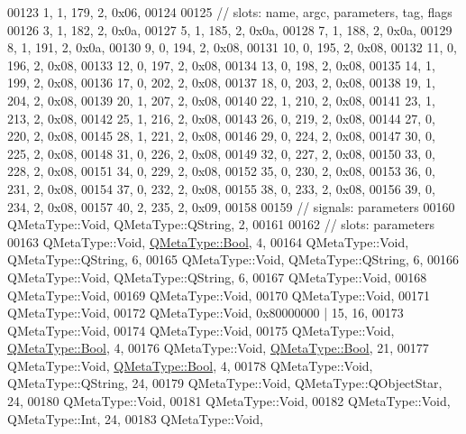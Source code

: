 \begin{DoxyCode}
00123        1,    1,  179,    2, 0x06,
00124 
00125  \textcolor{comment}{// slots: name, argc, parameters, tag, flags}
00126        3,    1,  182,    2, 0x0a,
00127        5,    1,  185,    2, 0x0a,
00128        7,    1,  188,    2, 0x0a,
00129        8,    1,  191,    2, 0x0a,
00130        9,    0,  194,    2, 0x08,
00131       10,    0,  195,    2, 0x08,
00132       11,    0,  196,    2, 0x08,
00133       12,    0,  197,    2, 0x08,
00134       13,    0,  198,    2, 0x08,
00135       14,    1,  199,    2, 0x08,
00136       17,    0,  202,    2, 0x08,
00137       18,    0,  203,    2, 0x08,
00138       19,    1,  204,    2, 0x08,
00139       20,    1,  207,    2, 0x08,
00140       22,    1,  210,    2, 0x08,
00141       23,    1,  213,    2, 0x08,
00142       25,    1,  216,    2, 0x08,
00143       26,    0,  219,    2, 0x08,
00144       27,    0,  220,    2, 0x08,
00145       28,    1,  221,    2, 0x08,
00146       29,    0,  224,    2, 0x08,
00147       30,    0,  225,    2, 0x08,
00148       31,    0,  226,    2, 0x08,
00149       32,    0,  227,    2, 0x08,
00150       33,    0,  228,    2, 0x08,
00151       34,    0,  229,    2, 0x08,
00152       35,    0,  230,    2, 0x08,
00153       36,    0,  231,    2, 0x08,
00154       37,    0,  232,    2, 0x08,
00155       38,    0,  233,    2, 0x08,
00156       39,    0,  234,    2, 0x08,
00157       40,    2,  235,    2, 0x09,
00158 
00159  \textcolor{comment}{// signals: parameters}
00160     QMetaType::Void, QMetaType::QString,    2,
00161 
00162  \textcolor{comment}{// slots: parameters}
00163     QMetaType::Void, \hyperlink{a00001_a76a8b016e5ad61faf9062cc387df5016}{QMetaType::Bool},    4,
00164     QMetaType::Void, QMetaType::QString,    6,
00165     QMetaType::Void, QMetaType::QString,    6,
00166     QMetaType::Void, QMetaType::QString,    6,
00167     QMetaType::Void,
00168     QMetaType::Void,
00169     QMetaType::Void,
00170     QMetaType::Void,
00171     QMetaType::Void,
00172     QMetaType::Void, 0x80000000 | 15,   16,
00173     QMetaType::Void,
00174     QMetaType::Void,
00175     QMetaType::Void, \hyperlink{a00001_a76a8b016e5ad61faf9062cc387df5016}{QMetaType::Bool},    4,
00176     QMetaType::Void, \hyperlink{a00001_a76a8b016e5ad61faf9062cc387df5016}{QMetaType::Bool},   21,
00177     QMetaType::Void, \hyperlink{a00001_a76a8b016e5ad61faf9062cc387df5016}{QMetaType::Bool},    4,
00178     QMetaType::Void, QMetaType::QString,   24,
00179     QMetaType::Void, QMetaType::QObjectStar,   24,
00180     QMetaType::Void,
00181     QMetaType::Void,
00182     QMetaType::Void, QMetaType::Int,   24,
00183     QMetaType::Void,

\end{DoxyCode}
